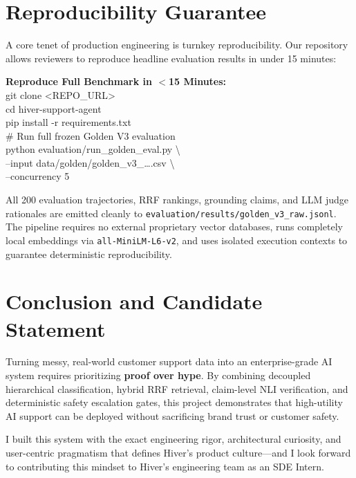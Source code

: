 \documentclass[10pt,twocolumn,a4paper]{article}
\begin{document}
\section{Reproducibility Guarantee}\label{sec:repro}

A core tenet of production engineering is turnkey reproducibility.
Our repository allows reviewers to reproduce headline evaluation
results in under 15 minutes:

\begin{tcolorbox}[accent]
\small\ttfamily
\textbf{Reproduce Full Benchmark in $<$15 Minutes:}\\[3pt]
git clone <REPO\_URL>\\
cd hiver-support-agent\\
pip install -r requirements.txt\\[2pt]
\# Run full frozen Golden V3 evaluation\\
python evaluation/run\_golden\_eval.py \textbackslash\\
\hspace*{8pt}--input data/golden/golden\_v3\_\ldots.csv \textbackslash\\
\hspace*{8pt}--concurrency 5
\end{tcolorbox}

\medskip\noindent
All 200 evaluation trajectories, RRF rankings, grounding claims, and
LLM judge rationales are emitted cleanly to
\texttt{evaluation/results/golden\_v3\_raw.jsonl}. The pipeline requires
no external proprietary vector databases, runs completely local
embeddings via \texttt{all-MiniLM-L6-v2}, and uses isolated execution
contexts to guarantee deterministic reproducibility.

\section{Conclusion and Candidate Statement}\label{sec:conclusion}

Turning messy, real-world customer support data into an enterprise-grade
AI system requires prioritizing \textbf{proof over hype}. By combining
decoupled hierarchical classification, hybrid RRF retrieval, claim-level
NLI verification, and deterministic safety escalation gates, this project
demonstrates that high-utility AI support can be deployed without
sacrificing brand trust or customer safety.

I built this system with the exact engineering rigor, architectural
curiosity, and user-centric pragmatism that defines Hiver's product
culture---and I look forward to contributing this mindset to Hiver's
engineering team as an SDE Intern.

\balance
\end{document}
